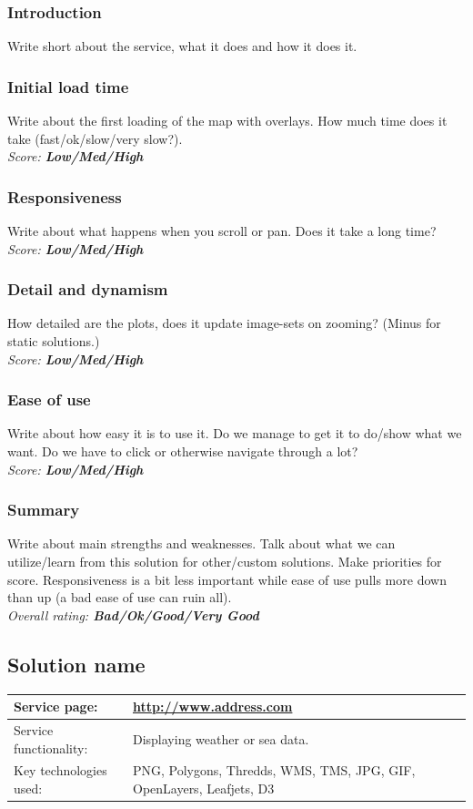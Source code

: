 \documentclass[11pt,a4paper,titlepage,oneside]{report}
\begin{document}
\subsubsection{Introduction}
Write short about the service, what it does and how it does it.
\subsubsection{Initial load time}
Write about the first loading of the map with overlays. How much time does it take (fast/ok/slow/very slow?).
\\ \emph{Score: \textbf{Low/Med/High}}
\subsubsection{Responsiveness}
Write about what happens when you scroll or pan. Does it take a long time?
\\ \emph{Score: \textbf{Low/Med/High}}
\subsubsection{Detail and dynamism}
How detailed are the plots, does it update image-sets on zooming? (Minus for static solutions.) 
\\ \emph{Score: \textbf{Low/Med/High}}
\subsubsection{Ease of use}
Write about how easy it is to use it. Do we manage to get it to do/show what we want. Do we have to click or otherwise navigate through a lot?
\\ \emph{Score: \textbf{Low/Med/High}}
\subsubsection{Summary}
Write about main strengths and weaknesses. Talk about what we can utilize/learn from this solution for other/custom solutions. Make priorities for score. Responsiveness is a bit less important while ease of use pulls more down than up (a bad ease of use can ruin all).
\\ \emph{Overall rating: \textbf{Bad/Ok/Good/Very Good}}

\subsection{Solution name}
\begin{tabular}{|p{4cm}|p{8cm}|}

\hline
Service page: & \url{http://www.address.com} \\%
\hline
Service functionality: & Displaying weather or sea data. \\
\hline
Key technologies used: & PNG, Polygons, Thredds, WMS, TMS, JPG, GIF, OpenLayers, Leafjets, D3 \\
\hline
\end{tabular}
\end{document}
